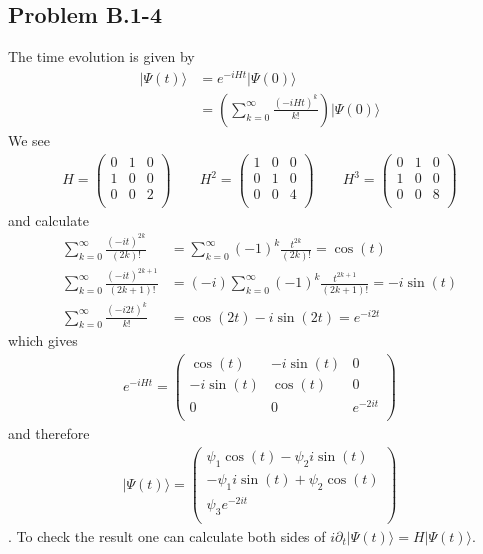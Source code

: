 \documentclass[../main.tex]{subfiles}
\begin{document}
\subsection{Problem B.1-4}
The time evolution is given by
\begin{align}
    |\Psi(t)\rangle&=e^{-iHt}|\Psi(0)\rangle\\
    &=\left(\sum_{k=0}^\infty\frac{(-iHt)^k}{k!}\right)|\Psi(0)\rangle
\end{align}
We see
\begin{align}
H=\left(
\begin{array}{ccc}
 0 & 1 & 0 \\
 1 & 0 & 0 \\
 0 & 0 & 2 \\
\end{array}
\right)\qquad
H^2=\left(
\begin{array}{ccc}
 1 & 0 & 0 \\
 0 & 1 & 0 \\
 0 & 0 & 4 \\
\end{array}
\right)
\qquad
H^3=\left(
\begin{array}{ccc}
 0 & 1 & 0 \\
 1 & 0 & 0 \\
 0 & 0 & 8 \\
\end{array}
\right)
\end{align}
and calculate
\begin{align}
    \sum_{k=0}^\infty\frac{(-it)^{2k}}{(2k)!}&=\sum_{k=0}^\infty(-1)^k \frac{t^{2k}}{(2k)!}=\cos(t)\\
    \sum_{k=0}^\infty\frac{(-it)^{2k+1}}{(2k+1)!}&=(-i)\sum_{k=0}^\infty(-1)^{k}\frac{t^{2k+1}}{(2k+1)!}=-i\sin(t)\\
    \sum_{k=0}^\infty\frac{(-i2t)^k}{k!}&=\cos(2t)-i\sin(2t)=e^{-i2t}
\end{align}
which gives
\begin{align}
    e^{-iHt}=\left(
\begin{array}{ccc}
 \cos (t) & -i \sin (t) & 0 \\
 -i \sin (t) & \cos (t) & 0 \\
 0 & 0 & e^{-2 i t} \\
\end{array}
\right)
\end{align}
and therefore
\begin{align}
|\Psi(t)\rangle=\left(
\begin{array}{ccc}
 \psi_1\cos (t)  -\psi_2i \sin (t) \\
 -\psi_1i \sin (t) + \psi_2\cos (t) \\
 \psi_3e^{-2 i t} \\
\end{array}
\right)
\end{align}.
To check the result one can calculate both sides of $i\partial_t|\Psi(t)\rangle=H|\Psi(t)\rangle$.
\end{document}
